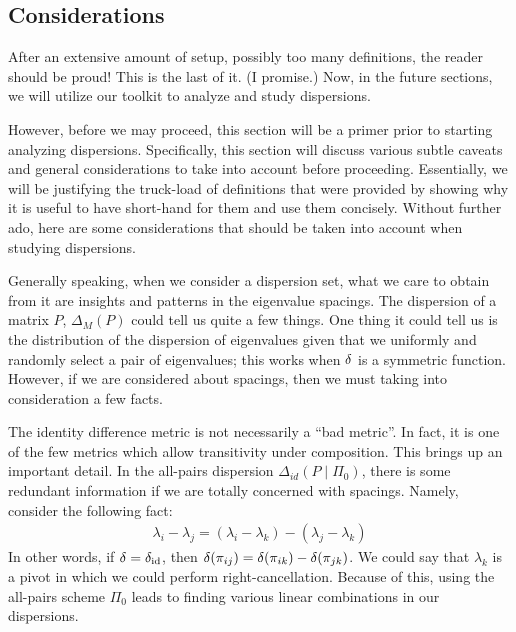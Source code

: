 \subsection{Considerations}

After an extensive amount of setup, possibly too many definitions, the reader should be proud! This is the last of it. (I promise.)
Now, in the future sections, we will utilize our toolkit to analyze and study dispersions. \newline

However, before we may proceed, this section will be a primer prior to starting analyzing dispersions.
Specifically, this section will discuss various subtle caveats and general considerations to take into account before proceeding.
Essentially, we will be justifying the truck-load of definitions that were provided by showing why it is useful to have short-hand for them and use them concisely.
Without further ado, here are some considerations that should be taken into account when studying dispersions. \newline

Generally speaking, when we consider a dispersion set, what we care to obtain from it are insights and patterns in the eigenvalue spacings.
The dispersion of a matrix $P$, $\Delta_M(P)$ could tell us quite a few things.
One thing it could tell us is the distribution of the dispersion of eigenvalues given that we uniformly and randomly select a pair of eigenvalues;
this works when $\delta$ is a symmetric function. However, if we are considered about spacings, then we must taking into consideration a few facts.
\newline
\medskip

 The identity difference metric is not necessarily a ``bad metric''.
In fact, it is one of the few metrics which allow transitivity under composition.
This brings up an important detail.
In the all-pairs dispersion $\Delta_{id}(P \mid \Pi_0)$, there is some redundant information if we are totally concerned with spacings. Namely, consider the following fact:
\begin{align*}
\lambda_i - \lambda_j = (\lambda_i - \lambda_k) - (\lambda_j - \lambda_k)
\end{align*}
In other words, if $\delta = \delta_{\text{id}}$, then $\delta(\pi_{ij}) = \delta(\pi_{ik}) - \delta(\pi_{jk})$.
We could say that $\lambda_k$ is a pivot in which we could perform right-cancellation.
Because of this, using the all-pairs scheme $\Pi_0$ leads to finding various linear combinations in our dispersions.
\newline
\medskip

